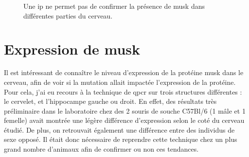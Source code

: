 \begin{figure}[h]
\begin{center}
\begin{subfigure}[h]{0.49\textwidth}
			\end{subfigure}
		\end{center}
		\caption{Une \gls{ip} ne permet pas de confirmer la présence de \gls{musk} dans différentes parties du cerveau.}
		\label{fig:WBResultat}
	\end{figure}

\section{Expression de \gls{musk}}
\label{sec:ExpressionMuSK}
	Il est intéressant de connaître le niveau d'expression de la protéine \gls{musk} dans le cerveau, afin de voir si la mutation allait impactée l'expression de la protéine. Pour cela, j'ai eu recours à la technique de \gls{qpcr} sur trois structures différentes : le cervelet, et l'hippocampe gauche ou droit. En effet, des résultats très préliminaire dans le laboratoire chez des 2 souris de souche C57Bl/6 (1 mâle et 1 femelle) avait montrée une légère différence d'expression selon le coté du cerveau étudié. De plus, on retrouvait également une différence entre des individus de sexe opposé. Il était donc nécessaire de reprendre cette technique chez un plus grand nombre d'animaux afin de confirmer ou non ces tendances.
